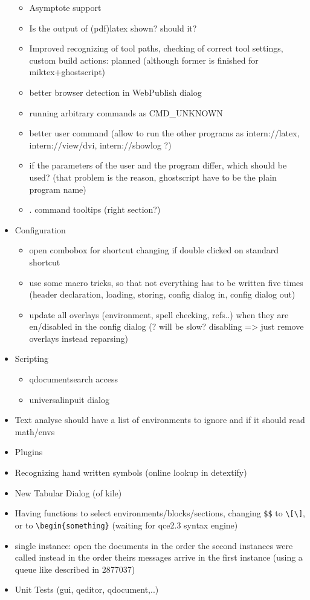 \documentclass[10pt,a4paper,landscape]{report}
\begin{document}
\begin{itemize}
\begin{itemize}
		\item Asymptote support
		\item Is the output of (pdf)latex shown? should it?
		\item Improved recognizing of tool paths, checking of correct tool settings,  custom build actions: planned (although former is finished for miktex+ghostscript)
		\item better browser detection in WebPublish dialog 
		\item running arbitrary commands as CMD\_UNKNOWN
		\item better user command (allow to run the other programs as intern://latex, intern://view/dvi, intern://showlog ?)
		\item if the parameters of the user and the program differ, which should be used? (that problem is the reason, ghostscript have to be the plain program name)
		\item . command tooltips (right section?)
	\end{itemize}
	\item Configuration \begin{itemize}
		\item open combobox for shortcut changing if double clicked on standard shortcut
		\item use some macro tricks, so that not everything has to be written five times (header declaration, loading, storing, config dialog in, config dialog out)
		\item update all overlays (environment, spell checking, refs..) when they are en/disabled in the config dialog (? will be slow? disabling => just remove overlays instead reparsing)
	\end{itemize} 
	\item  Scripting
	\begin{itemize}
	\item qdocumentsearch access
	\item universalinpuit dialog
	\end{itemize}
	\item Text analyse should have a list of environments to ignore and if it should read math/envs
	\item Plugins
	\item Recognizing hand written symbols (online lookup in detextify)
	\item New Tabular Dialog (of kile)
	\item Having functions to select environments/blocks/sections, changing \verb+$$+ to \verb+\[\]+, or to \verb+\begin{something}+ (waiting for qce2.3 syntax engine)
	\item single instance: open the documents in the order the second instances were called instead in the order theirs messages arrive in the first instance (using a queue like described in 2877037)
	\item Unit Tests (gui, qeditor, qdocument,..)
\end{itemize}
\end{document}
